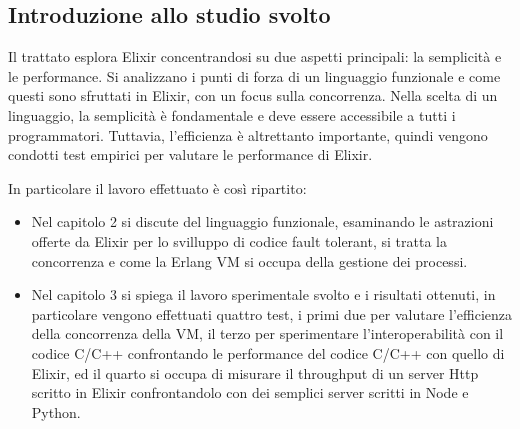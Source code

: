 \subsection{Introduzione allo studio svolto}

Il trattato esplora Elixir concentrandosi su due aspetti principali:
la semplicità e le performance. Si analizzano i punti di forza di 
un linguaggio funzionale e come questi sono sfruttati in Elixir, con 
un focus sulla concorrenza. Nella scelta di un linguaggio, la semplicità
è fondamentale e deve essere accessibile a tutti i programmatori.
Tuttavia, l'efficienza è altrettanto importante, quindi vengono condotti
test empirici per valutare le performance di Elixir.

In particolare il lavoro effettuato è così ripartito: 


\begin{itemize}
	\item Nel capitolo 2 si discute del linguaggio funzionale,
	esaminando le astrazioni offerte da Elixir per lo svilluppo
	di codice fault tolerant, si tratta la concorrenza e come la Erlang VM
	si occupa della gestione dei processi.
	\item Nel capitolo 3 si spiega il lavoro sperimentale svolto e i risultati
	ottenuti, in particolare vengono effettuati quattro test, i primi due
	per valutare l'efficienza della concorrenza della VM, il terzo per
	sperimentare l'interoperabilità con il codice C/C++ confrontando le
	performance del codice C/C++ con quello di Elixir, ed il quarto
	si occupa di misurare il throughput di un server Http scritto in
	Elixir confrontandolo con dei semplici server scritti in Node
	e Python.

\end{itemize}



